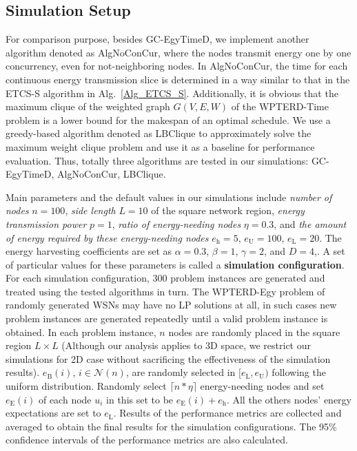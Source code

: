 \documentclass[journal,10pt]{IEEEtran}
\begin{document}
\subsection{Simulation Setup}
For comparison purpose, besides GC-EgyTimeD, we implement another algorithm denoted as AlgNoConCur, where the nodes transmit energy one by one concurrency, even for not-neighboring nodes. In AlgNoConCur, the time for each continuous energy transmission slice is determined in a way similar to that in the ETCS-S algorithm in Alg.~\ref{Alg_ETCS_S}. Additionally, it is obvious that the maximum clique of the weighted graph $G(V,E,W)$ of the WPTERD-Time problem is a lower bound for the makespan of an optimal schedule. We use a greedy-based algorithm denoted as LBClique to approximately solve the maximum weight clique problem and use it as a baseline for performance evaluation. Thus, totally three algorithms are tested in our simulations: GC-EgyTimeD, AlgNoConCur, LBClique.

Main parameters and the default values in our simulations include \textit{number of nodes} $n{=}100$, \textit{side length} $L{=}10$ of the square network region, \textit{energy transmission power} $p{=}1$, \textit{ratio of energy-needing nodes} $\eta{=}0.3$, and \textit{the amount of energy required by these energy-needing nodes} $e_\text{h}{=}5$, $e_\text{U}{=}100$, $e_\text{L}{=}20$. The energy harvesting coefficients are set as $\alpha{=}0.3$, $\beta{=}1$, $\gamma{=}2$, and $D{=}4$,. A set of particular values for these parameters is called a \textbf{simulation configuration}. For each simulation configuration, 300 problem instances are generated and treated using the tested algorithms in turn. The WPTERD-Egy problem of randomly generated WSNs may have no LP solutions at all, in such cases new problem instances are generated repeatedly until a valid problem instance is obtained. In each problem instance, $n$ nodes are randomly placed in the square region $L{\times}L$ (Although our analysis applies to 3D space, we restrict our simulations for 2D case without sacrificing the effectiveness of the simulation results). $e_\text{B}(i)$, $i{\in}\mathcal{N}(n)$, are randomly selected in $[e_\text{L},e_\text{U})$ following the uniform distribution. Randomly select ${\lceil}n{*}\eta{\rceil}$ energy-needing nodes and set $e_\text{E}(i)$ of each node $u_i$ in this set to be $e_\text{E}(i){+}e_\text{h}$. All the others nodes' energy expectations are set to $e_\text{L}$. Results of the performance metrics are collected and averaged to obtain the final results for the simulation configurations. The 95\% confidence intervals of the performance metrics are also calculated.
\end{document}
